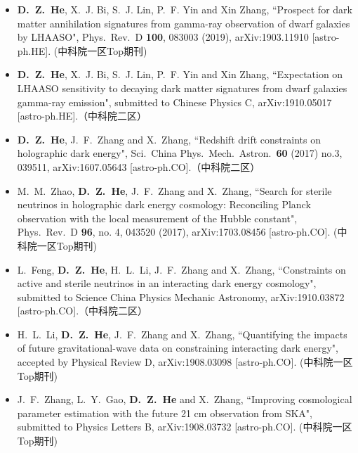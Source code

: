   \begin{itemize}[leftmargin=*]
    
    \item \textbf{D.~Z.~He}, X.~J. Bi, S.~J. Lin, P.~F. Yin and Xin Zhang, ``Prospect for dark matter annihilation signatures from gamma-ray observation of dwarf galaxies by LHAASO", Phys.\ Rev.\ D {\bf 100}, 083003 (2019), arXiv:1903.11910 [astro-ph.HE]. (中科院一区Top期刊)
    
    \item \textbf{D.~Z.~He}, X.~J. Bi, S.~J. Lin, P.~F. Yin and Xin Zhang, ``Expectation on LHAASO sensitivity to decaying dark matter signatures from dwarf galaxies gamma-ray emission", submitted to Chinese Physics C, arXiv:1910.05017 [astro-ph.HE].（中科院二区）
          
    \item \textbf{D.~Z.~He}, J.~F.~Zhang and X.~Zhang, ``Redshift drift constraints on holographic dark energy", Sci.\ China Phys.\ Mech.\ Astron.\  {\bf 60} (2017) no.3, 039511, arXiv:1607.05643 [astro-ph.CO].（中科院二区）

    \item  M.~M.~Zhao, \textbf{D.~Z.~He}, J.~F.~Zhang and X.~Zhang, ``Search for sterile neutrinos in holographic dark energy cosmology: Reconciling Planck observation with the local measurement of the Hubble constant", Phys.\ Rev.\ D {\bf 96}, no. 4, 043520 (2017), arXiv:1703.08456 [astro-ph.CO]. (中科院一区Top期刊)         

    \item L.~Feng, {\bf D.~Z.~He}, H.~L.~Li, J.~F.~Zhang and X.~Zhang, ``Constraints on active and sterile neutrinos in an interacting dark energy cosmology", submitted to Science China Physics Mechanic Astronomy, arXiv:1910.03872 [astro-ph.CO].（中科院二区）

    \item H.~L.~Li, \textbf{D.~Z.~He}, J.~F.~Zhang and X.~Zhang, ``Quantifying the impacts of future gravitational-wave data on constraining interacting dark energy", accepted by Physical Review D, arXiv:1908.03098 [astro-ph.CO]. (中科院一区Top期刊)


    \item J.~F.~Zhang, L.~Y.~Gao, \textbf{D.~Z.~He} and X.~Zhang, ``Improving cosmological parameter estimation with the future 21 cm observation from SKA", submitted to  Physics Letters B, arXiv:1908.03732 [astro-ph.CO]. (中科院一区Top期刊)
     

\end{itemize}
